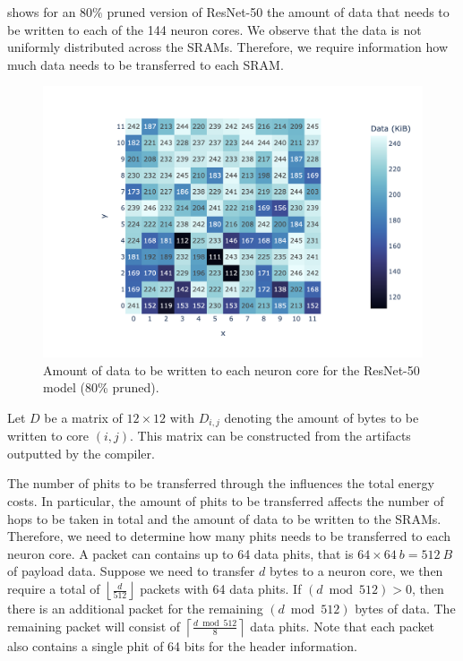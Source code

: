  shows for an $80\%$ pruned version of ResNet-50 the amount of data that needs to be written to each of the 144 neuron cores.
We observe that the data is not uniformly distributed across the SRAMs.
Therefore, we require information how much data needs to be transferred to each SRAM.

\begin{figure}[hbtp]
    \centering
    \includegraphics[clip, trim=80 20 10 30, width=0.8\linewidth]{assets/resnet50_coredata_heatmap.png}
    \caption{Amount of data to be written to each neuron core for the ResNet-50 model (80\% pruned).}
    \label{fig:model_data_heapmap}
\end{figure}

Let $D$ be a matrix of $12 \times 12$ with $D_{i,j}$ denoting the amount of bytes to be written to core $\left( i,j \right)$.
This matrix can be constructed from the artifacts outputted by the compiler.

The number of phits to be transferred through the \confignoc{} influences the total energy costs.
In particular, the amount of phits to be transferred affects the number of hops to be taken in total and the amount of data to be written to the SRAMs.
Therefore, we need to determine how many phits needs to be transferred to each neuron core.
A packet can contains up to 64 data phits, that is $64 \times \SI{64}{b} = \SI{512}{B}$ of payload data.
Suppose we need to transfer $d$ bytes to a neuron core, we then require a total of $\left\lfloor \frac{d}{512} \right\rfloor$ packets with 64 data phits.
If $\left( d \bmod 512 \right) > 0$, then there is an additional packet for the remaining $\left( d \bmod 512 \right)$ bytes of data.
The remaining packet will consist of $\left\lceil \frac{d \bmod 512}{8}\right\rceil$ data phits.
Note that each packet also contains a single phit of 64 bits for the header information.

